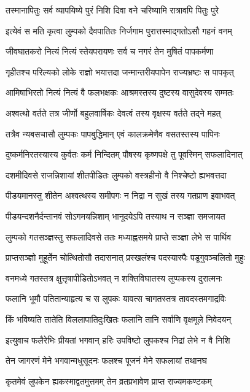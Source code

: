 \twolineshloka
{तस्मानापितुः सर्व व्यापयिष्ये पुरं निशि}
{दिवा वने चरिष्यामि रात्रावपि पितुः पुरे} %

\twolineshloka
{इत्येवं स मति कृत्वा लुम्पको दैवपातितः}
{निर्जगाम पुरात्तस्माद्गतोऽसौ गहनं वनम्} %

\twolineshloka
{जीवघातकरो नित्यं नित्यं स्तेयपरायणः}
{सर्व च नगरं तेन मुषितं पापकर्मणा} %

\twolineshloka
{गृहीतश्च परिल्यको लोके राज्ञो भयात्तदा}
{जन्मान्तरीयपापेन राज्यभ्रष्टः स पापकृत्} %

\twolineshloka
{आमिषाभिरतो नित्यं नित्यं वै फलभक्षकः}
{आश्रमस्तस्य दुष्टस्य वासुदेवस्य सम्मतः} %

\twolineshloka
{अश्वत्थो वर्तते तत्र जीर्णो बहुलवार्षिकः}
{देवत्वं तस्य वृक्षस्य वर्तते तद्ने महत्} %

\twolineshloka
{तत्रैव न्यबसचासौ लुम्पकः पापबुद्धिमान्}
{एवं कालक्रमेणैव वसतस्तस्य पापिनः} %

\twolineshloka
{दुष्कर्मनिरतस्यास्य कुर्वतः कर्म निन्दितम्}
{पौषस्य कृष्णपक्षे तु पूवस्मिन् सफलादिनात्} %

\twolineshloka
{दशमीदिवसे राजन्निशायां शीतपीडितः}
{लुम्पको वस्त्रहीनो वै निश्चेष्टो ह्यभवत्तदा} %

\twolineshloka
{पीडयमानस्तु शीतेन अश्वत्थस्य समीपगः}
{न निद्रा न सुखं तस्य गतप्राण इवाभवत्} %

\twolineshloka
{पीडयन्दशनैर्दन्तानवं सोऽगमयन्निशाम्}
{भानूदयेऽपि तस्याथ न सञ्ज्ञा समजायत} %

\twolineshloka
{लुम्पको गतसञ्ज्ञस्तु सफलादिवसे ततः}
{मध्याह्नसमये प्राप्ते सञ्ज्ञा लेभे स पार्थिव} %

\twolineshloka
{प्राप्तसञ्ज्ञो मुहूर्तेन चोत्थितोसौ तदासनात्}
{प्रस्खलंश्च पदस्यास्पैः पडूगुवञ्चलितो मुहुः} %

\twolineshloka
{वनमध्ये गतस्तत्र क्षुत्तृषापीडितोऽभवत्}
{न शक्तिविघातस्य लुप्पकस्य दुरात्मनः} %

\twolineshloka
{फलानि भूमौ पतितान्याहृत्य च स लुपकः}
{यावत्स चागतस्तत्र तावदस्तमगाद्रविः} %

\twolineshloka
{किं भविष्यति तातेति विललापातिदुःखितः}
{फलानि तानि सर्वाणि वृक्षमूले निवेदयन्} %

\twolineshloka
{इत्युवाच फलैरेभिः प्रीयतां भगवान् हरिः}
{उपविष्टो लुपकश्च निद्रां लेभे न वै निशि} %

\twolineshloka
{तेन जागरणं मेने भगवान्मधुसूदनः}
{फलश्च पूजनं मेने सफलायां तथानघ} %

\twolineshloka
{कृतमेवं लुपकेन ह्यकस्माद्वतमुत्तमम्}
{तेन व्रतप्रभावेण प्राप्त राज्यमकण्टकम्} %

